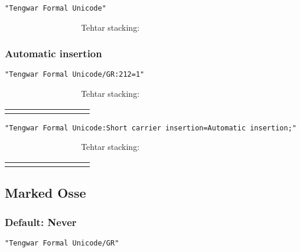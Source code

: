 \documentclass[11pt,a4paper]{article}
\begin{document}
\noindent \texttt{"Tengwar Formal Unicode"}

\formalAAT      \normalfont Tehtar stacking:
\formalAAT  


\subsubsection{Automatic insertion}

\texttt{"Tengwar Formal Unicode/GR:212=1"}

\formalGRinsert      \normalfont Tehtar stacking:
\formalGRinsert  

\begin{tabular}{ c | c c c c c c c c}
	\combinationsrow{} \hline
	\combinationsrow{}
	\combinationsrow{}
	\combinationsrow{}
	\combinationsrow{}
	\combinationsrow{}
	\combinationsrow{}
	\combinationsrow{}
	\combinationsrow{}
\end{tabular}

\noindent \texttt{"Tengwar Formal Unicode:Short carrier insertion=Automatic insertion;"}

\formalAATinsert      \normalfont Tehtar stacking:
\formalAATinsert  

\begin{tabular}{ c | c c c c c c c c}
	\combinationsrow{} \hline
	\combinationsrow{}
	\combinationsrow{}
	\combinationsrow{}
	\combinationsrow{}
	\combinationsrow{}
	\combinationsrow{}
	\combinationsrow{}
	\combinationsrow{}
\end{tabular}


\subsection{Marked Osse}

\subsubsection{Default: Never}

\texttt{"Tengwar Formal Unicode/GR"}
\end{document}
